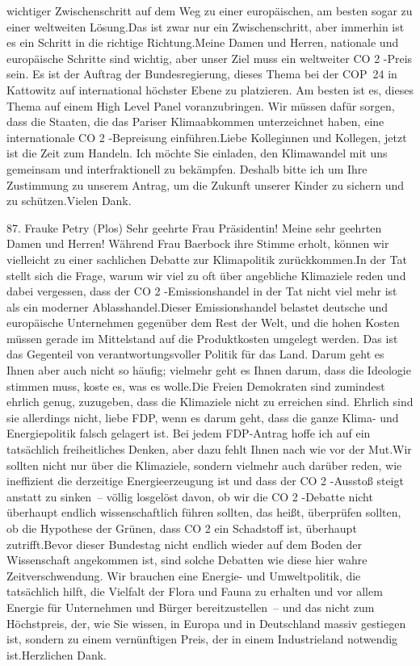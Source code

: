 \documentclass{article}
\begin{document}
wichtiger Zwischenschritt auf dem Weg zu einer europäischen, am besten sogar zu einer weltweiten Lösung.Das ist zwar nur ein Zwischenschritt, aber immerhin ist es ein Schritt in die richtige Richtung.Meine Damen und Herren, nationale und europäische Schritte sind wichtig, aber unser Ziel muss ein weltweiter CO 2 -Preis sein. Es ist der Auftrag der Bundesregierung, dieses Thema bei der COP 24 in Kattowitz auf international höchster Ebene zu platzieren. Am besten ist es, dieses Thema auf einem High Level Panel voranzubringen. Wir müssen dafür sorgen, dass die Staaten, die das Pariser Klimaabkommen unterzeichnet haben, eine internationale CO 2 -Bepreisung einführen.Liebe Kolleginnen und Kollegen, jetzt ist die Zeit zum Handeln. Ich möchte Sie einladen, den Klimawandel mit uns gemeinsam und interfraktionell zu bekämpfen. Deshalb bitte ich um Ihre Zustimmung zu unserem Antrag, um die Zukunft unserer Kinder zu sichern und zu schützen.Vielen Dank.




	87. Frauke Petry (Plos) Sehr geehrte Frau Präsidentin! Meine sehr geehrten Damen und Herren! Während Frau Baerbock ihre Stimme erholt, können wir vielleicht zu einer sachlichen Debatte zur Klimapolitik zurückkommen.In der Tat stellt sich die Frage, warum wir viel zu oft über angebliche Klimaziele reden und dabei vergessen, dass der CO 2 -Emissionshandel in der Tat nicht viel mehr ist als ein moderner Ablasshandel.Dieser Emissionshandel belastet deutsche und europäische Unternehmen gegenüber dem Rest der Welt, und die hohen Kosten müssen gerade im Mittelstand auf die Produktkosten umgelegt werden. Das ist das Gegenteil von verantwortungsvoller Politik für das Land. Darum geht es Ihnen aber auch nicht so häufig; vielmehr geht es Ihnen darum, dass die Ideologie stimmen muss, koste es, was es wolle.Die Freien Demokraten sind zumindest ehrlich genug, zuzugeben, dass die Klimaziele nicht zu erreichen sind. Ehrlich sind sie allerdings nicht, liebe FDP, wenn es darum geht, dass die ganze Klima- und Energiepolitik falsch gelagert ist. Bei jedem FDP-Antrag hoffe ich auf ein tatsächlich freiheitliches Denken, aber dazu fehlt Ihnen nach wie vor der Mut.Wir sollten nicht nur über die Klimaziele, sondern vielmehr auch darüber reden, wie ineffizient die derzeitige Energieerzeugung ist und dass der CO 2 -Ausstoß steigt anstatt zu sinken – völlig losgelöst davon, ob wir die CO 2 -Debatte nicht überhaupt endlich wissenschaftlich führen sollten, das heißt, überprüfen sollten, ob die Hypothese der Grünen, dass CO 2 ein Schadstoff ist, überhaupt zutrifft.Bevor dieser Bundestag nicht endlich wieder auf dem Boden der Wissenschaft angekommen ist, sind solche Debatten wie diese hier wahre Zeitverschwendung. Wir brauchen eine Energie- und Umweltpolitik, die tatsächlich hilft, die Vielfalt der Flora und Fauna zu erhalten und vor allem Energie für Unternehmen und Bürger bereitzustellen – und das nicht zum Höchstpreis, der, wie Sie wissen, in Europa und in Deutschland massiv gestiegen ist, sondern zu einem vernünftigen Preis, der in einem Industrieland notwendig ist.Herzlichen Dank.
\end{document}

